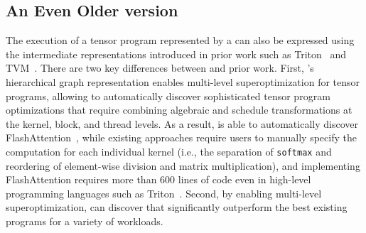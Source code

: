 \subsection*{An Even Older version}
The execution of a tensor program represented by a \graph can also be expressed using the intermediate representations introduced in prior work such as Triton~\cite{triton} and TVM~\cite{tvm}. There are two key differences between \sys and prior work. 
%
First, \graph's hierarchical graph representation enables multi-level superoptimization for tensor programs, allowing \sys to automatically discover sophisticated tensor program optimizations that require combining algebraic and schedule transformations at the kernel, block, and thread levels.
%
As a result, \sys is able to automatically discover FlashAttention~\cite{dao2023flash}, while existing approaches require users to manually specify the computation for each individual kernel (i.e., the separation of {\tt softmax} and reordering of element-wise division and matrix multiplication), and implementing FlashAttention requires more than 600 lines of code even in high-level programming languages such as Triton~\cite{triton_flashattention}.
Second, by enabling multi-level superoptimization, \sys can discover \graphs that significantly outperform the best existing programs for a variety of workloads.
\fi
